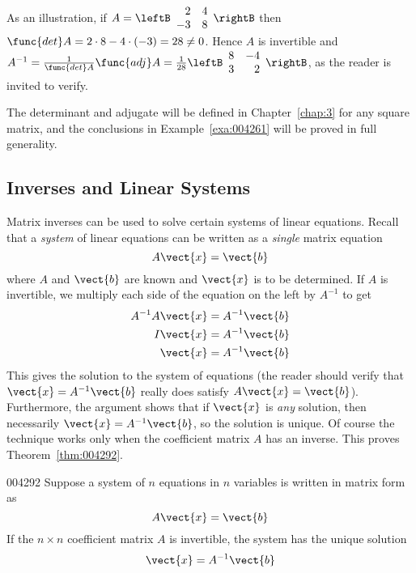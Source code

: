 \noindent As an illustration, if $A = \leftB \begin{array}{rr}
2 & 4 \\
-3 & 8
\end{array} \rightB$
 then $\func{det } A = 2 \cdot 8 - 4 \cdot (-3) = 28 \neq 0$. Hence $A$ is invertible and $A^{-1} = \frac{1}{\func{det } A} \func{adj } A = \frac{1}{28} \leftB \begin{array}{rr}
 8 &-4 \\
 3 & 2
 \end{array} \rightB$, as the reader is invited to verify.


The determinant and adjugate will be defined in Chapter~\ref{chap:3} for any square matrix, and the conclusions in Example~\ref{exa:004261} will be proved in full generality.


\subsection*{Inverses and Linear Systems}


Matrix inverses can be used to solve certain systems of linear equations. Recall that a \textit{system} of linear equations can be written as a \textit{single} matrix equation
\begin{equation*}
A\vect{x} = \vect{b}
\end{equation*}
where $A$ and $\vect{b}$ are known and $\vect{x}$ is to be determined. If $A$ is invertible, we multiply each side of the equation on the left by $A^{-1}$ to get
\begin{align*}
A^{-1}A\vect{x} &= A^{-1}\vect{b} \\
I\vect{x} &= A^{-1}\vect{b} \\
\vect{x} &= A^{-1}\vect{b}
\end{align*}
This gives the solution to the system of equations (the reader should verify that $\vect{x} = A^{-1}\vect{b}$ really does satisfy $A\vect{x} = \vect{b}$). Furthermore, the argument shows that if $\vect{x}$ is \textit{any} solution, then necessarily $\vect{x} = A^{-1}\vect{b}$, so the solution is unique. Of course the technique works only when the coefficient matrix $A$ has an inverse. This proves Theorem~\ref{thm:004292}.


\begin{theorem}{}{004292}
Suppose a system of $n$ equations in $n$ variables is written in matrix form as
\begin{equation*}
A\vect{x} = \vect{b}
\end{equation*}
If the $n \times n$ coefficient matrix $A$ is invertible, the system has the unique solution
\begin{equation*}
\vect{x} = A^{-1}\vect{b}
\end{equation*}
\end{theorem}

